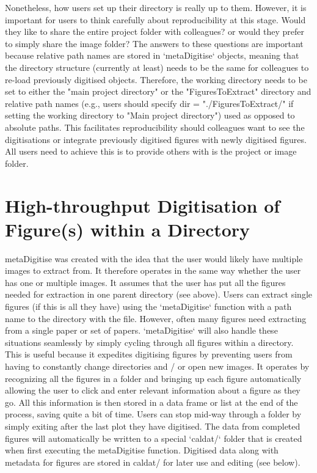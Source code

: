 \documentclass{article}
\begin{document}
Nonetheless, how users set up their directory is really up to them. However, it is important for users to think carefully about reproducibility at this stage. Would they like to share the entire project folder with colleagues? or would they prefer to simply share the image folder? The answers to these questions are important because relative path names are stored in `metaDigitise` objects, meaning that the directory structure (currently at least) needs to be the same for colleagues to re-load previously digitised objects. Therefore, the working directory needs to be set to either the "main project directory" or the "FiguresToExtract" directory and relative path names (e.g., users should specify dir = "./FiguresToExtract/" if setting the working directory to "Main project directory") used as opposed to absolute paths. This facilitates reproducibility should colleagues want to see the digitisations or integrate previously digitised figures with newly digitised figures. All users need to achieve this is to provide others with is the project or image folder.

\section*{High-throughput Digitisation of Figure(s) within a Directory}
metaDigitise was created with the idea that the user would likely have multiple images to extract from. It therefore operates in the same way whether the user has one or multiple images. It assumes that the user has put all the figures needed for extraction in one parent directory (see above). Users can extract single figures (if this is all they have) using the `metaDigitise` function with a path name to the directory with the file. However, often many figures need extracting from a single paper or set of papers. `metaDigitise` will also handle these situations seamlessly by simply cycling through all figures within a directory. This is useful because it expedites digitising figures by preventing users from having to constantly change directories and / or open new images. It operates by recognizing all the figures in a folder and bringing up each figure automatically allowing the user to click and enter relevant information about a figure as they go. All this information is then stored in a data frame or list at the end of the process, saving quite a bit of time. Users can stop mid-way through a folder by simply exiting after the last plot they have digitised. The data from completed figures will automatically be written to a special `caldat/` folder that is created when first executing the metaDigitise function. Digitised data along with metadata for figures are stored in caldat/ for later use and editing (see below).
\end{document}

